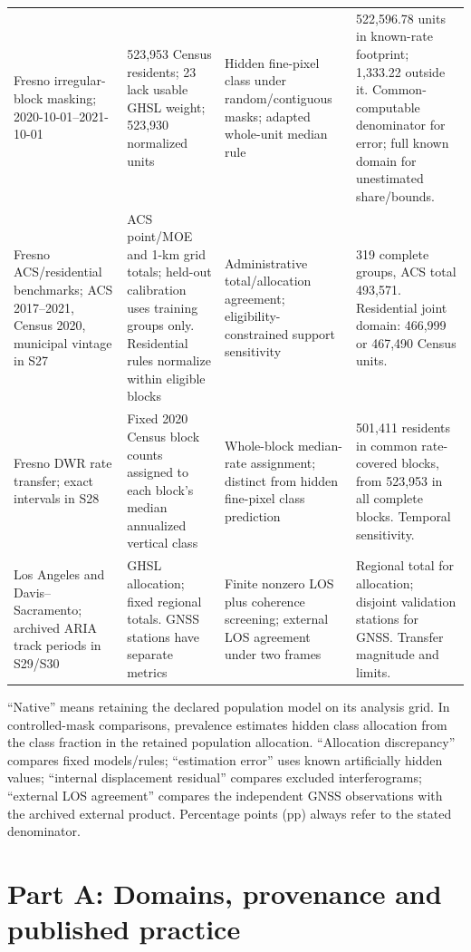 \documentclass[10pt,a4paper]{article}
\begin{document}
\begin{longtable}{p{.16\linewidth}p{.25\linewidth}p{.27\linewidth}p{.24\linewidth}}
Fresno irregular-block masking; 2020-10-01--2021-10-01 & 523,953 Census residents; 23 lack usable GHSL weight; 523,930 normalized units & Hidden fine-pixel class under random/contiguous masks; adapted whole-unit median rule & 522,596.78 units in known-rate footprint; 1,333.22 outside it. Common-computable denominator for error; full known domain for unestimated share/bounds.\\
Fresno ACS/residential benchmarks; ACS 2017--2021, Census 2020, municipal vintage in S27 & ACS point/MOE and 1-km grid totals; held-out calibration uses training groups only. Residential rules normalize within eligible blocks & Administrative total/allocation agreement; eligibility-constrained support sensitivity & 319 complete groups, ACS total 493,571. Residential joint domain: 466,999 or 467,490 Census units.\\
Fresno DWR rate transfer; exact intervals in S28 & Fixed 2020 Census block counts assigned to each block's median annualized vertical class & Whole-block median-rate assignment; distinct from hidden fine-pixel class prediction & 501,411 residents in common rate-covered blocks, from 523,953 in all complete blocks. Temporal sensitivity.\\
Los Angeles and Davis--Sacramento; archived ARIA track periods in S29/S30 & GHSL allocation; fixed regional totals. GNSS stations have separate metrics & Finite nonzero LOS plus coherence screening; external LOS agreement under two frames & Regional total for allocation; disjoint validation stations for GNSS. Transfer magnitude and limits.\\\bottomrule
\end{longtable}\addtocounter{table}{-1}\normalsize\setlength{\tabcolsep}{6pt}
``Native'' means retaining the declared population model on its analysis grid. In controlled-mask comparisons, prevalence estimates hidden class allocation from the class fraction in the retained population allocation. ``Allocation discrepancy'' compares fixed models/rules; ``estimation error'' uses known artificially hidden values; ``internal displacement residual'' compares excluded interferograms; ``external LOS agreement'' compares the independent GNSS observations with the archived external product. Percentage points (pp) always refer to the stated denominator.


\section*{Part A: Domains, provenance and published practice}
\end{document}

